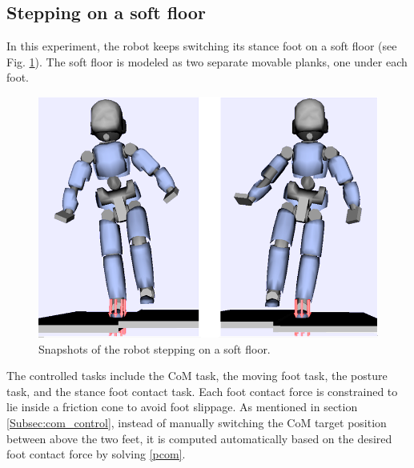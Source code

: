 \documentclass[letterpaper, 10 pt, conference]{ieeeconf}  %
\begin{document}
\subsection{Stepping on a soft floor}
In this experiment, the robot keeps switching its stance foot on a soft floor (see Fig. \ref{walking}). The soft floor is modeled as two separate movable planks, one under each foot.
\begin{figure}[!t]
\centering
\vspace{5pt}
\includegraphics[width=.75\linewidth]{../figure/switch_contact_foot2.png}
\caption{Snapshots of the robot stepping on a soft floor.}
\label{walking}
\end{figure}
The controlled tasks include the CoM task, the moving foot task, the posture task, and the stance foot contact task. Each foot contact force is constrained to lie inside a friction cone to avoid foot slippage. As mentioned in section \ref{Subsec:com_control}, instead of manually switching the CoM target position between above the two feet, it is computed automatically based on the desired foot contact force by solving \eqref{pcom}. 
\end{document}
